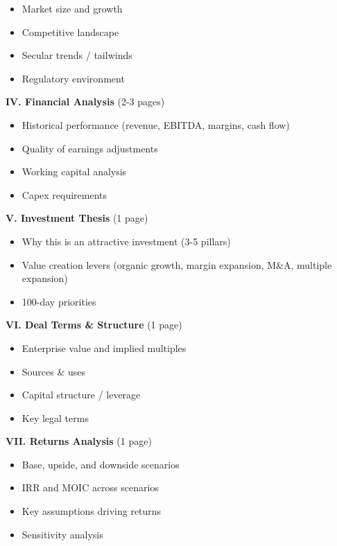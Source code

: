 \documentclass[11pt]{article}
\begin{document}
\begin{itemize}[leftmargin=*,itemsep=2pt,topsep=2pt]
\item {} Market size and growth
\item {} Competitive landscape
\item {} Secular trends / tailwinds
\item {} Regulatory environment
\end{itemize}

\textbf{IV. Financial Analysis} (2-3 pages)

\begin{itemize}[leftmargin=*,itemsep=2pt,topsep=2pt]
\item {} Historical performance (revenue, EBITDA, margins, cash flow)
\item {} Quality of earnings adjustments
\item {} Working capital analysis
\item {} Capex requirements
\end{itemize}

\textbf{V. Investment Thesis} (1 page)

\begin{itemize}[leftmargin=*,itemsep=2pt,topsep=2pt]
\item {} Why this is an attractive investment (3-5 pillars)
\item {} Value creation levers (organic growth, margin expansion, M\&A, multiple expansion)
\item {} 100-day priorities
\end{itemize}

\textbf{VI. Deal Terms \& Structure} (1 page)

\begin{itemize}[leftmargin=*,itemsep=2pt,topsep=2pt]
\item {} Enterprise value and implied multiples
\item {} Sources \& uses
\item {} Capital structure / leverage
\item {} Key legal terms
\end{itemize}

\textbf{VII. Returns Analysis} (1 page)

\begin{itemize}[leftmargin=*,itemsep=2pt,topsep=2pt]
\item {} Base, upside, and downside scenarios
\item {} IRR and MOIC across scenarios
\item {} Key assumptions driving returns
\item {} Sensitivity analysis
\end{itemize}
\end{document}

